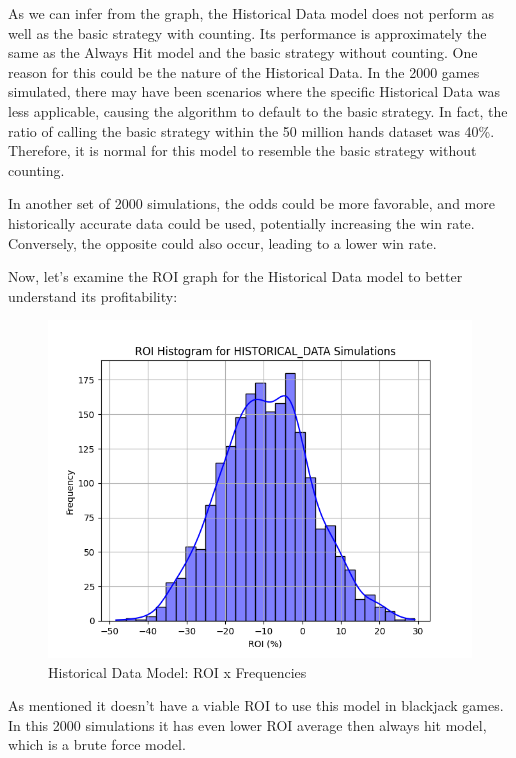 \documentclass[a4paper,12pt]{report}
\begin{document}
As we can infer from the graph, the Historical Data model does not perform as well as the basic strategy with counting. Its performance is approximately the same as the Always Hit model and the basic strategy without counting. One reason for this could be the nature of the Historical Data. In the 2000 games simulated, there may have been scenarios where the specific Historical Data was less applicable, causing the algorithm to default to the basic strategy. In fact, the ratio of calling the basic strategy within the 50 million hands dataset was 40\%. Therefore, it is normal for this model to resemble the basic strategy without counting.

In another set of 2000 simulations, the odds could be more favorable, and more historically accurate data could be used, potentially increasing the win rate. Conversely, the opposite could also occur, leading to a lower win rate.

Now, let's examine the ROI graph for the Historical Data model to better understand its profitability:

\begin{figure}[h]
\begin{center}
\includegraphics[scale=0.5]{figures/graphs/hd_roi.png}
\end{center}
\caption{Historical Data Model: ROI x Frequencies}
\label{fig:hd_roi}
\end{figure}

As mentioned it doesn't have a viable ROI to use this model in blackjack games. In this 2000 simulations it has even lower ROI average then always hit model, which is a brute force model.
\end{document}
